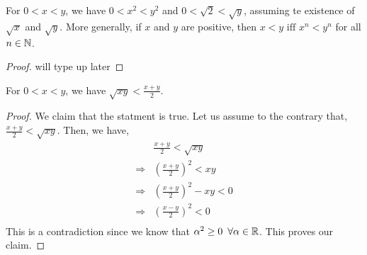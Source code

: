 \documentclass{scrartcl}
\begin{document}
    \begin{example}
        For $0 < x < y$, we have $0<x^2<y^2$ and $0<\sqrt{2}<\sqrt{y}$, assuming te existence of $\sqrt{x}$ and $\sqrt{y}$. More generally, if $x$ and $y$ are positive, then $x < y \text{ iff } x^n < y^n$ for all $n \in \mathbb{N}$.
		\begin{proof}
            will type up later
		\end{proof}
    \end{example}
    \begin{example}
        For $0 < x < y$, we have $\sqrt{xy} < \frac{x + y}{2}$.
        \begin{proof}
            We claim that the statment is true. Let us assume to the contrary that, $\frac{x + y}{2} < \sqrt{xy}$. Then, we have, 
            \begin{align*}
			    &\frac{x + y}{2} < \sqrt{xy} \\
			    \Rightarrow &\left(\frac{x + y}{2}\right)^2 < xy \tag{Example 1}\\
			    \Rightarrow &\left(\frac{x + y}{2}\right)^2 - xy < 0 \\
			    \Rightarrow &\left(\frac{x - y}{2}\right)^2 < 0 \\
		    \end{align*}
		    This is a contradiction since we know that $\alpha^2 \geq 0 \,\,\, \forall \alpha \in \mathbb{R}$. This proves our claim.
        \end{proof}
    \end{example}
\end{document}
